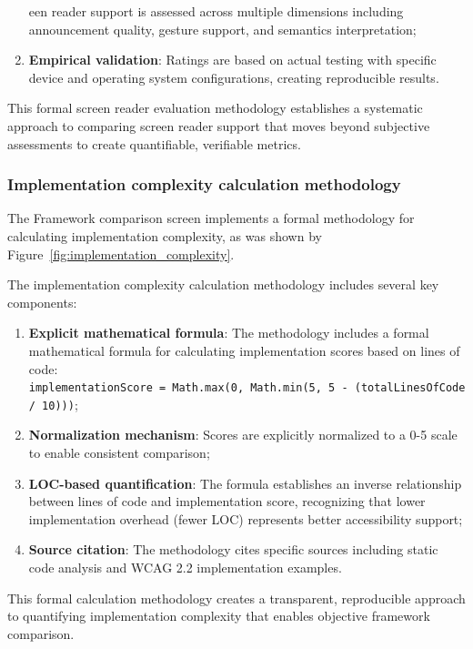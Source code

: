 \begin{enumerate}
een reader support is assessed across multiple dimensions including announcement quality, gesture support, and semantics interpretation;
    
    \item \textbf{Empirical validation}: Ratings are based on actual testing with specific device and operating system configurations, creating reproducible results.
\end{enumerate}

This formal screen reader evaluation methodology establishes a systematic approach to comparing screen reader support that moves beyond subjective assessments to create quantifiable, verifiable metrics.

\subsubsection{Implementation complexity calculation methodology}

The Framework comparison screen implements a formal methodology for calculating implementation complexity, as was shown by Figure~\ref{fig:implementation_complexity}.

The implementation complexity calculation methodology includes several key components:

\begin{enumerate}
    \item \textbf{Explicit mathematical formula}: The methodology includes a formal mathematical formula for calculating implementation scores based on lines of code: \\\texttt{implementationScore = Math.max(0, Math.min(5, 5 - (totalLinesOfCode / 10)))};
    
    \item \textbf{Normalization mechanism}: Scores are explicitly normalized to a 0-5 scale to enable consistent comparison;
    
    \item \textbf{LOC-based quantification}: The formula establishes an inverse relationship between lines of code and implementation score, recognizing that lower implementation overhead (fewer LOC) represents better accessibility support;
    
    \item \textbf{Source citation}: The methodology cites specific sources including static code analysis and WCAG 2.2 implementation examples.
\end{enumerate}

This formal calculation methodology creates a transparent, reproducible approach to quantifying implementation complexity that enables objective framework comparison.

